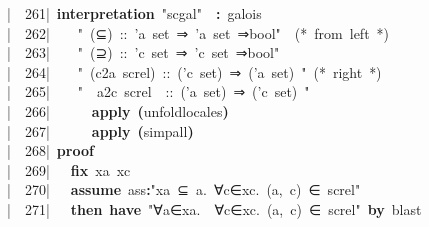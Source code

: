 \documentclass{article}
\newcommand{\syntaxCOMMENTA}[1]{\textcolor[rgb]{0.8,0.0,0.0}{#1}}
\newcommand{\syntaxKEYWORDA}[1]{\textcolor[rgb]{0.0,0.4,0.6}{\textbf{#1}}}
\newcommand{\syntaxKEYWORDC}[1]{\textcolor[rgb]{0.0,0.6,1.0}{\textbf{#1}}}
\newcommand{\syntaxLITERALA}[1]{\textcolor[rgb]{1.0,0.0,0.8}{#1}}
\newcommand{\syntaxOPERATOR}[1]{\textcolor[rgb]{0.0,0.0,0.0}{\textbf{#1}}}
\newcommand{\syntaxCOMMENTA}[1]{\textcolor[rgb]{0.8,0.0,0.0}{#1}}
\newcommand{\syntaxKEYWORDA}[1]{\textcolor[rgb]{0.0,0.4,0.6}{\textbf{#1}}}
\newcommand{\syntaxKEYWORDC}[1]{\textcolor[rgb]{0.0,0.6,1.0}{\textbf{#1}}}
\newcommand{\syntaxLITERALA}[1]{\textcolor[rgb]{1.0,0.0,0.8}{#1}}
\newcommand{\syntaxOPERATOR}[1]{\textcolor[rgb]{0.0,0.0,0.0}{\textbf{#1}}}
\newcommand{\syntaxCOMMENTA}[1]{\textcolor[rgb]{0.8,0.0,0.0}{#1}}
\newcommand{\syntaxKEYWORDA}[1]{\textcolor[rgb]{0.0,0.4,0.6}{\textbf{#1}}}
\newcommand{\syntaxKEYWORDC}[1]{\textcolor[rgb]{0.0,0.6,1.0}{\textbf{#1}}}
\newcommand{\syntaxLITERALA}[1]{\textcolor[rgb]{1.0,0.0,0.8}{#1}}
\newcommand{\syntaxOPERATOR}[1]{\textcolor[rgb]{0.0,0.0,0.0}{\textbf{#1}}}
\newcommand{\syntaxCOMMENTA}[1]{\textcolor[rgb]{0.8,0.0,0.0}{\textbf{#1}}}
\newcommand{\syntaxKEYWORDA}[1]{\textcolor[rgb]{0.0,0.4,0.6}{#1}}
\newcommand{\syntaxKEYWORDC}[1]{\textcolor[rgb]{0.0,0.6,1.0}{#1}}
\newcommand{\syntaxLITERALA}[1]{\textcolor[rgb]{1.0,0.0,0.8}{\textbf{#1}}}
\newcommand{\syntaxOPERATOR}[1]{\textcolor[rgb]{0.0,0.0,0.0}{#1}}
\newcommand{\syntaxCOMMENTA}[1]{\textcolor[rgb]{0.8,0.0,0.0}{#1}}
\newcommand{\syntaxKEYWORDA}[1]{\textcolor[rgb]{0.0,0.4,0.6}{\textbf{#1}}}
\newcommand{\syntaxKEYWORDC}[1]{\textcolor[rgb]{0.0,0.6,1.0}{\textbf{#1}}}
\newcommand{\syntaxLITERALA}[1]{\textcolor[rgb]{1.0,0.0,0.8}{#1}}
\newcommand{\syntaxOPERATOR}[1]{\textcolor[rgb]{0.0,0.0,0.0}{\textbf{#1}}}
\newcommand{\syntaxCOMMENTA}[1]{\textcolor[rgb]{0.8,0.0,0.0}{#1}}
\newcommand{\syntaxKEYWORDA}[1]{\textcolor[rgb]{0.0,0.4,0.6}{\textbf{#1}}}
\newcommand{\syntaxKEYWORDC}[1]{\textcolor[rgb]{0.0,0.6,1.0}{\textbf{#1}}}
\newcommand{\syntaxLITERALA}[1]{\textcolor[rgb]{1.0,0.0,0.8}{#1}}
\newcommand{\syntaxOPERATOR}[1]{\textcolor[rgb]{0.0,0.0,0.0}{\textbf{#1}}}
\newcommand{\syntaxCOMMENTA}[1]{\textcolor[rgb]{0.0,0.0,0.0}{#1}}
\newcommand{\syntaxKEYWORDA}[1]{\textcolor[rgb]{0.0,0.0,0.0}{#1}}
\newcommand{\syntaxKEYWORDC}[1]{\textcolor[rgb]{0.0,0.0,0.0}{#1}}
\newcommand{\gutter}[1]{\textcolor[rgb]{0,0,0}{{|}#1}}
\newcommand{\gutterH}[1]{\textcolor[rgb]{1,0,0}{{|}#1}}
\begin{document}
\gutter{\ \ 261{|}\ }\syntaxKEYWORDA{interpretation}{\ }\syntaxLITERALA{"sc\usebox{\underscorebox}gal"}{\ }{\ }\syntaxOPERATOR{:}{\ }galois{\ }\hspace*{\fill}\\
\gutter{\ \ 262{|}\ }{\ }{\ }{\ }\syntaxLITERALA{"{\ }(⊆){\ }::{\ }'a{\ }set{\ }⇒{\ }'a{\ }set{\ }⇒bool"}{\ }{\ }\syntaxCOMMENTA{(*{\ }from{\ }left{\ }*)}\hspace*{\fill}\\
\gutter{\ \ 263{|}\ }{\ }{\ }{\ }\syntaxLITERALA{"{\ }(⊇){\ }::{\ }'c{\ }set{\ }⇒{\ }'c{\ }set{\ }⇒bool"}\hspace*{\fill}\\
\gutter{\ \ 264{|}\ }{\ }{\ }{\ }\syntaxLITERALA{"{\ }(c2a{\ }sc\usebox{\underscorebox}rel){\ }::{\ }('c{\ }set){\ }⇒{\ }('a{\ }set){\ }"}{\ }\syntaxCOMMENTA{(*{\ }right{\ }*)}\hspace*{\fill}\\
\gutterH{\ \ 265{|}\ }{\ }{\ }{\ }\syntaxLITERALA{"{\ }{\ }a2c{\ }sc\usebox{\underscorebox}rel{\ }{\ }::{\ }('a{\ }set){\ }⇒{\ }('c{\ }set){\ }"}\hspace*{\fill}\\
\gutter{\ \ 266{|}\ }{\ }{\ }{\ }{\ }{\ }\syntaxKEYWORDA{apply}{\ }\syntaxOPERATOR{(}unfold\usebox{\underscorebox}locales\syntaxOPERATOR{)}\hspace*{\fill}\\
\gutter{\ \ 267{|}\ }{\ }{\ }{\ }{\ }{\ }\syntaxKEYWORDA{apply}{\ }\syntaxOPERATOR{(}simp\usebox{\underscorebox}all\syntaxOPERATOR{)}{\ }{\ }\hspace*{\fill}\\
\gutter{\ \ 268{|}\ }\syntaxKEYWORDA{proof}{\ }\hspace*{\fill}\\
\gutter{\ \ 269{|}\ }{\ }{\ }\syntaxKEYWORDC{fix}{\ }xa{\ }xc\hspace*{\fill}\\
\gutterH{\ \ 270{|}\ }{\ }{\ }\syntaxKEYWORDC{assume}{\ }ass\syntaxOPERATOR{:}\syntaxLITERALA{"xa{\ }⊆{\ }\usebox{\opencurlybracket}a.{\ }∀c∈xc.{\ }(a,{\ }c){\ }∈{\ }sc\usebox{\underscorebox}rel\usebox{\closecurlybracket}"}\hspace*{\fill}\\
\gutter{\ \ 271{|}\ }{\ }{\ }\syntaxKEYWORDA{then}{\ }\syntaxKEYWORDA{have}{\ }\syntaxLITERALA{"∀a∈xa.{\ }{\ }∀c∈xc.{\ }(a,{\ }c){\ }∈{\ }sc\usebox{\underscorebox}rel"}{\ }\syntaxKEYWORDA{by}{\ }blast\hspace*{\fill}\\
\end{document}
